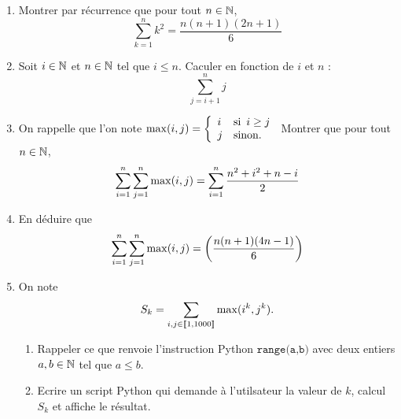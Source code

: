 \documentclass[a4paper, 11pt,reqno]{article}
\begin{document}




\begin{exercice}
\begin{enumerate}
\item Montrer par récurrence que pour tout $n\in \mathbb{N}$, 
$$ \sum_{k=1}^n  k^2= \frac{n(n+1)(2n+1)}{6}$$

\item Soit $i\in \mathbb{N}$ et $n\in \mathbb{N}$ tel que $i\leq n$. Caculer en fonction de $i$ et $n$ :
$$\sum_{j=i+1}^n j$$

\item 
On rappelle que l'on note $\max(i,j) =  \left\{
    \begin{array}{ll}
       i & \text{si\, } i \geq j \\
        j & \mbox{sinon.}
    \end{array}
\right.
$
Montrer que pour tout $n\in \mathbb{N}$, $$\displaystyle \sum_{i=1}^n \sum_{j=1}^n \max(i,j)  = \sum_{i=1}^n \frac{n^2+i^2 +n-i}{2}$$ 
\item En déduire que 
$$\displaystyle\sum_{i=1}^n \sum_{j=1}^n  \max(i,j) = \left(   \frac{n(n+1)(4n-1)}{6} \right)	 $$

\item On note $$S_k =  \sum_{i,j\in \llbracket 1,1000\rrbracket} \max(i^k,j^k).$$ 
\begin{enumerate}
\item Rappeler ce que renvoie l'instruction Python $\texttt{range(a,b)}$ avec deux entiers $a,b\in \mathbb{N}$ tel que $a\leq b$.
\item Ecrire un script Python qui demande à l'utilsateur la valeur de $k$, calcul $S_k$ et affiche le résultat. 
\end{enumerate}
\end{enumerate}
\end{exercice}
\end{document}
